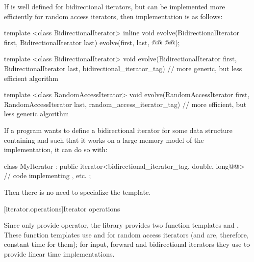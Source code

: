 \pnum
\enterexample
If
is well defined for bidirectional iterators, but can be implemented more
efficiently for random access iterators, then  implementation is as
follows:

\begin{codeblock}
template <class BidirectionalIterator>
inline void
evolve(BidirectionalIterator first, BidirectionalIterator last) {
  evolve(first, last,
    @@
    @@);
}

template <class BidirectionalIterator>
void evolve(BidirectionalIterator first, BidirectionalIterator last,
  bidirectional_iterator_tag) {
  // more generic, but less efficient algorithm
}

template <class RandomAccessIterator>
void evolve(RandomAccessIterator first, RandomAccessIterator last,
  random_access_iterator_tag) {
  // more efficient, but less generic algorithm
}
\end{codeblock}
\exitexample

\pnum
\enterexample
If a \Cpp program wants to define a bidirectional iterator for some data structure containing
and such that it
works on a large memory model of the implementation, it can do so with:

\begin{codeblock}
class MyIterator :
  public iterator<bidirectional_iterator_tag, double, long@@> {
  // code implementing \tcode{++}, etc.
};
\end{codeblock}

\pnum
Then there is no need to specialize the
\added{, }
  template.
\exitexample

[iterator.operations]{Iterator operations}

\pnum
Since only  provide
\tcode{+} 
\tcode{-}
operator, the library provides two
function templates
and
.
These
function templates
use
\tcode{+}
and
\tcode{-}
for random access iterators (and are, therefore, constant
time for them); for input, forward and bidirectional iterators they use
\tcode{++}
to provide linear time
implementations.

